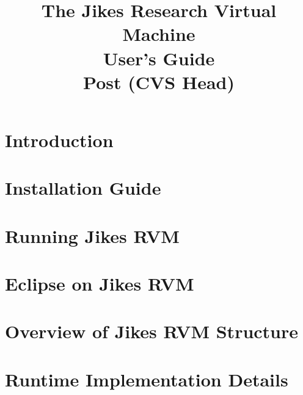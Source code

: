 \documentclass{article}
\title{\texonly{\vfill} {\huge The Jikes\TMboth{} 
Research Virtual Machine \\
User's Guide} \\ {\huge Post \version (CVS Head)}\\ { } \texonly{\vfill} }
\newcommand{\jrvm}{Jikes RVM}
\begin{document}
\maketitle
\date{}

\T \newpage
   \T 
   \T \cleardoublepage

\label{hlxtoc}
\T \tableofcontents
\T \listoffigures
\T \listoftables
\W {}

\T \newpage
\section{Introduction}


\T \newpage
{}
\section{Installation Guide} \label{section:installation}


\T \newpage
\section{Running \jrvm} \label{section:running}


\T \newpage
\section{Eclipse on Jikes RVM} \label{section:eclipse}


\T \newpage
{}
\section{Overview of \jrvm{} Structure}


\T \newpage
{}
\section{Runtime Implementation Details}


\T \newpage
{}
\end{document}
